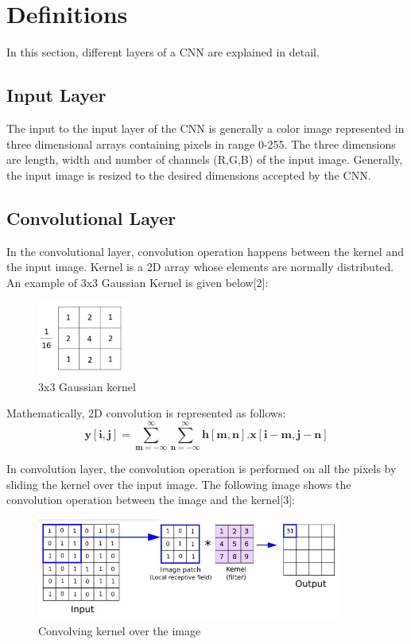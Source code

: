 \documentclass{IEEEtran}
\begin{document}
\section{Definitions}
In this section, different layers of a CNN are explained in detail.
\subsection{\textbf{Input Layer}}
The input to the input layer of the CNN is generally a color image represented in three dimensional arrays containing pixels in range 0-255. The three dimensions are length, width and number of channels (R,G,B) of the input image. Generally, the input image is resized to the desired dimensions accepted by the CNN. 

\subsection{\textbf{Convolutional Layer}}
In the convolutional layer, convolution operation happens between the kernel and the input image. Kernel is a 2D array whose elements are normally distributed. An example of 3x3 Gaussian Kernel is given below[2]:
\begin{figure}[h]
    \centering
    \captionsetup{justification=centering}
    \includegraphics[width=3cm]{Guassian kernel}
    \caption{3x3 Gaussian kernel }
    \label{fig:3x3 Guassian kernel}
\end{figure}

Mathematically, 2D convolution is represented as follows:
\begin{equation*}
\boldsymbol{y[i,j] = \sum_{m=-\infty}^{\infty}\sum_{n=-\infty}^{\infty} h[m,n] . x[i-m, j-n]}
\end{equation*}

In convolution layer, the convolution operation is performed on all the pixels by sliding the kernel over the input image. The following image shows the convolution operation between the image and the kernel[3]: 
\begin{figure}[h]
    \centering
    \captionsetup{justification=centering}
    \includegraphics[width=10cm]{conv2d}
    \caption{Convolving kernel over the image}
    \label{fig:3x3 Guassian kernel}
\end{figure}
\end{document}
